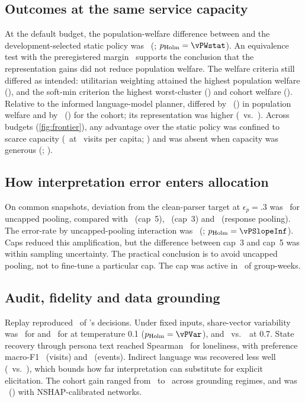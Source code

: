 \subsection{Outcomes at the same service capacity}
\label{sec:budgetresults}
At the default budget, the population-welfare difference between  and the development-selected static policy was \vDWstat\ (\vDWstatCI; $p_{\mathrm{Holm}}=\vPWstat$). %
An equivalence test with the preregistered margin \vTOSTstat\ supports the conclusion that the representation gains did not reduce population welfare. %
The welfare criteria still differed as intended: utilitarian weighting attained the highest population welfare (\vWsevenU), and the soft-min criterion the highest worst-cluster (\vWmSevenR) and cohort welfare (\vWsSevenR). Relative to the informed language-model planner,  differed by \vDWeight\ (\vDWeightCI) in population welfare and by \vDWseight\ (\vDWseightCI) for the cohort; its representation was higher (\vRhoSevenR\ vs.\ \vRhoEight). Across budgets (\cref{fig:frontier}), any advantage over the static policy was confined to scarce capacity (\vAdvMax\ at \vAdvMaxBudget\ visits per capita; \vAdvMaxCI) and was absent when capacity was generous (\vAdvRich; \vAdvRichCI).

\subsection{How interpretation error enters allocation}
\label{sec:errorresults}
On common snapshots, deviation from the clean-parser target at $\epsilon_p=.3$ was \vDevInfHigh\ for uncapped pooling, compared with \vDevCapFiveHigh\ (cap~5), \vDevCapThreeHigh\ (cap~3) and \vDevNaiveHigh\ (response pooling). The error-rate by uncapped-pooling interaction was \vSlopeInf\ (\vSlopeInfCI; $p_{\mathrm{Holm}}=\vPSlopeInf$). %
Caps reduced this amplification, but the difference between cap~3 and cap~5 was within sampling uncertainty. The practical conclusion is to avoid uncapped pooling, not to fine-tune a particular cap. The cap was active in \vCapActive\ of group-weeks.

\subsection{Audit, fidelity and data grounding}
\label{sec:checks}
Replay reproduced \vReplay\ of 's decisions. Under fixed inputs, share-vector variability was \vVarLowSevenR\ for  and \vVarLowEight\ for  at temperature 0.1 ($p_{\mathrm{Holm}}=\vPVar$), and \vVarHighSevenR\ vs.\ \vVarHighEight\ at 0.7. State recovery through persona text reached Spearman \vFidRho\ for loneliness, with preference macro-F1 \vFidVisit\ (visits) and \vFidEvent\ (events). Indirect language was recovered less well (\vFidIndirect\ vs.\ \vFidDirect), which bounds how far interpretation can substitute for explicit elicitation. The cohort gain ranged from \vRegWsLo\ to \vRegWsHi\ across grounding regimes, and was \vRegNshapDWs\ (\vRegNshapDWsCI) with NSHAP-calibrated networks.
